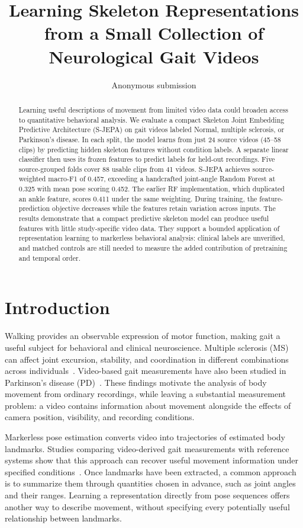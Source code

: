 \documentclass[10pt,twocolumn,letterpaper]{article}
\title{Learning Skeleton Representations\\from a Small Collection of Neurological Gait Videos}
\author{Anonymous submission}
\begin{document}
\maketitle

\begin{abstract}
Learning useful descriptions of movement from limited video data could broaden access to quantitative behavioral analysis. We evaluate a compact Skeleton Joint Embedding Predictive Architecture (S-JEPA) on gait videos labeled Normal, multiple sclerosis, or Parkinson's disease. In each split, the model learns from just 24 source videos (45--58 clips) by predicting hidden skeleton features without condition labels. A separate linear classifier then uses its frozen features to predict labels for held-out recordings. Five source-grouped folds cover 88 usable clips from 41 videos. S-JEPA achieves source-weighted macro-F1 of 0.457, exceeding a handcrafted joint-angle Random Forest at 0.325 with mean pose scoring 0.452. The earlier RF implementation, which duplicated an ankle feature, scores 0.411 under the same weighting. During training, the feature-prediction objective decreases while the features retain variation across inputs. The results demonstrate that a compact predictive skeleton model can produce useful features with little study-specific video data. They support a bounded application of representation learning to markerless behavioral analysis: clinical labels are unverified, and matched controls are still needed to measure the added contribution of pretraining and temporal order.
\end{abstract}

\section{Introduction}
Walking provides an observable expression of motor function, making gait a useful subject for behavioral and clinical neuroscience. Multiple sclerosis (MS) can affect joint excursion, stability, and coordination in different combinations across individuals~\cite{filli2018,plotnik2020}. Video-based gait measurements have also been studied in Parkinson's disease (PD)~\cite{shin2021}. These findings motivate the analysis of body movement from ordinary recordings, while leaving a substantial measurement problem: a video contains information about movement alongside the effects of camera position, visibility, and recording conditions.

Markerless pose estimation converts video into trajectories of estimated body landmarks. Studies comparing video-derived gait measurements with reference systems show that this approach can recover useful movement information under specified conditions~\cite{stenum2021,stenum2024}. Once landmarks have been extracted, a common approach is to summarize them through quantities chosen in advance, such as joint angles and their ranges. Learning a representation directly from pose sequences offers another way to describe movement, without specifying every potentially useful relationship between landmarks.
\end{document}
